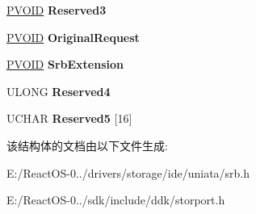 \begin{DoxyCompactItemize}
\hyperlink{interfacevoid}{P\+V\+O\+ID} {\bfseries Reserved3}
\item 
\mbox{\label{struct___s_c_s_i___w_m_i___r_e_q_u_e_s_t___b_l_o_c_k_ad5a06a18789b7e87002d107b6c53e429}} 
\hyperlink{interfacevoid}{P\+V\+O\+ID} {\bfseries Original\+Request}
\item 
\mbox{\label{struct___s_c_s_i___w_m_i___r_e_q_u_e_s_t___b_l_o_c_k_ac2c73632dfdc5b1c36cce82f54a9b913}} 
\hyperlink{interfacevoid}{P\+V\+O\+ID} {\bfseries Srb\+Extension}
\item 
\mbox{\label{struct___s_c_s_i___w_m_i___r_e_q_u_e_s_t___b_l_o_c_k_a39b793742b68216dd2d72a9d540c9656}} 
U\+L\+O\+NG {\bfseries Reserved4}
\item 
\mbox{\label{struct___s_c_s_i___w_m_i___r_e_q_u_e_s_t___b_l_o_c_k_a1c6b9001c15edab3ff3f9b0b6fbc8bb3}} 
U\+C\+H\+AR {\bfseries Reserved5} \mbox{[}16\mbox{]}
\end{DoxyCompactItemize}


该结构体的文档由以下文件生成\+:\begin{DoxyCompactItemize}
\item 
E\+:/\+React\+O\+S-\/0../drivers/storage/ide/uniata/srb.\+h\item 
E\+:/\+React\+O\+S-\/0../sdk/include/ddk/storport.\+h\end{DoxyCompactItemize}
